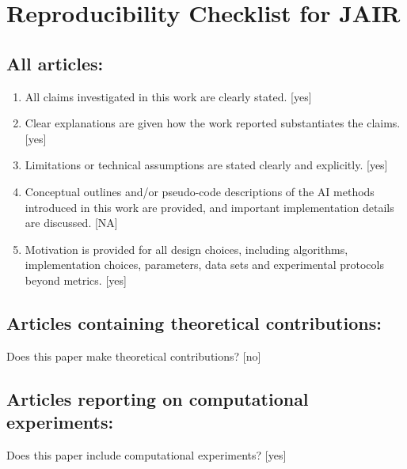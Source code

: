 \documentclass[manuscript, screen, review]{jair}
\begin{document}
\section{Reproducibility Checklist for JAIR}

\subsection*{All articles:}

\begin{enumerate}
    \item All claims investigated in this work are clearly stated. 
    [yes]
    \item Clear explanations are given how the work reported substantiates the claims. 
    [yes]
    \item Limitations or technical assumptions are stated clearly and explicitly. 
    [yes]
    \item Conceptual outlines and/or pseudo-code descriptions of the AI methods introduced in this work are provided, and important implementation details are discussed. 
    [NA]
    \item 
    Motivation is provided for all design choices, including algorithms, implementation choices, parameters, data sets and experimental protocols beyond metrics.
    [yes]
\end{enumerate}

\subsection*{Articles containing theoretical contributions:}
Does this paper make theoretical contributions? 
[no] 

\subsection*{Articles reporting on computational experiments:}
Does this paper include computational experiments? [yes]
\end{document}
